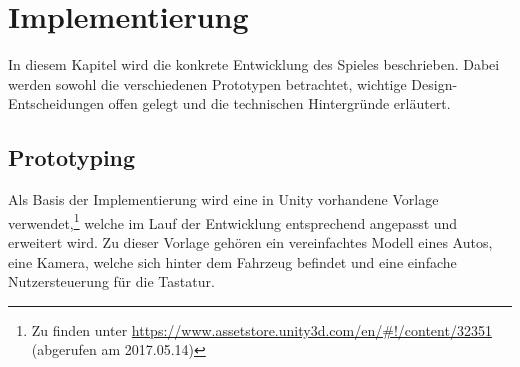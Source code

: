 \section{Implementierung}\label{sec:impl}
In diesem Kapitel wird die konkrete Entwicklung des Spieles beschrieben. Dabei werden sowohl die verschiedenen Prototypen betrachtet, wichtige Design-Entscheidungen offen gelegt und die technischen Hintergründe erläutert.
\subsection{Prototyping}
	Als Basis der Implementierung wird eine in Unity vorhandene Vorlage verwendet,\footnote{Zu finden unter \url{https://www.assetstore.unity3d.com/en/\#!/content/32351} (abgerufen am 2017.05.14)} welche im Lauf der Entwicklung entsprechend angepasst und erweitert wird. Zu dieser Vorlage gehören ein vereinfachtes Modell eines Autos, eine Kamera, welche sich hinter dem Fahrzeug befindet und eine einfache Nutzersteuerung für die Tastatur.

